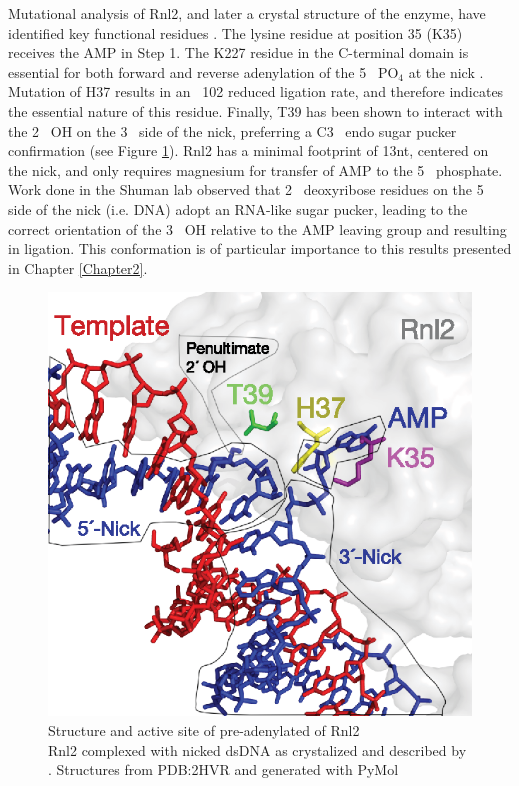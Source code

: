 Mutational analysis of Rnl2, and later a crystal structure of the enzyme, have identified key functional residues \citep{Ho2004, Nandakumar2006,Nandakumar2004a,Yin2003d}. The lysine residue at position 35 (K35) receives the AMP in Step 1. The K227 residue in the C-terminal domain is essential for both forward and reverse adenylation of the 5\textprime~ PO$_4$ at the nick \citep{Viollet2011}. Mutation of H37 results in an ~102 reduced ligation rate, and therefore indicates the essential nature of this residue. Finally, T39 has been shown to interact with the 2\textprime~ OH on the 3\textprime~ side of the nick, preferring a C3\textprime~ endo sugar pucker confirmation (see Figure \ref{fig:Rnl2 Active Site Residues}). Rnl2 has a minimal footprint of 13nt, centered on the nick, and only requires magnesium for transfer of AMP to the 5\textprime~ phosphate. Work done in the Shuman lab \citep{Nandakumar2006} observed that 2\textprime~ deoxyribose residues on the 5\textprime~ side of the nick (i.e. DNA) adopt an RNA-like sugar pucker, leading to the correct orientation of the 3\textprime~ OH relative to the AMP leaving group and resulting in ligation. This conformation is of particular importance to this results presented in Chapter \ref{Chapter2}.

\begin{figure}[htbp]
	\centering 
	\includegraphics{Figures/Chapter1/Rnl2_Active_Site_Residues.eps}
	\caption[Active site of T4 RNA Ligase 2 with highlighted residues]
	{
		Structure and active site of pre-adenylated of Rnl2\\[0.25cm]
		Rnl2 complexed with nicked dsDNA as crystalized and described by \citep{Nandakumar2006}. Structures from PDB:2HVR and generated with PyMol
	}
	\label{fig:Rnl2 Active Site Residues}
\end{figure}

